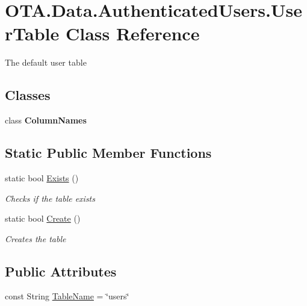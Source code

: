 \hypertarget{class_o_t_a_1_1_data_1_1_authenticated_users_1_1_user_table}{}\section{O\+T\+A.\+Data.\+Authenticated\+Users.\+User\+Table Class Reference}
\label{class_o_t_a_1_1_data_1_1_authenticated_users_1_1_user_table}


The default user table  


\subsection*{Classes}
\begin{DoxyCompactItemize}
\item 
class {\bfseries Column\+Names}
\end{DoxyCompactItemize}
\subsection*{Static Public Member Functions}
\begin{DoxyCompactItemize}
\item 
static bool \hyperlink{class_o_t_a_1_1_data_1_1_authenticated_users_1_1_user_table_a874e72fd8ce210e46effd0e356b80223}{Exists} ()
\begin{DoxyCompactList}\small\item\em Checks if the table exists \end{DoxyCompactList}\item 
static bool \hyperlink{class_o_t_a_1_1_data_1_1_authenticated_users_1_1_user_table_aed814a70dbb4019636f7dfd6bc5a076d}{Create} ()
\begin{DoxyCompactList}\small\item\em Creates the table \end{DoxyCompactList}\end{DoxyCompactItemize}
\subsection*{Public Attributes}
\begin{DoxyCompactItemize}
\item 
const String \hyperlink{class_o_t_a_1_1_data_1_1_authenticated_users_1_1_user_table_ab82259a205e6bf47e648017ae4d3f7ba}{Table\+Name} = \char`\"{}users\char`\"{}
\end{DoxyCompactItemize}
